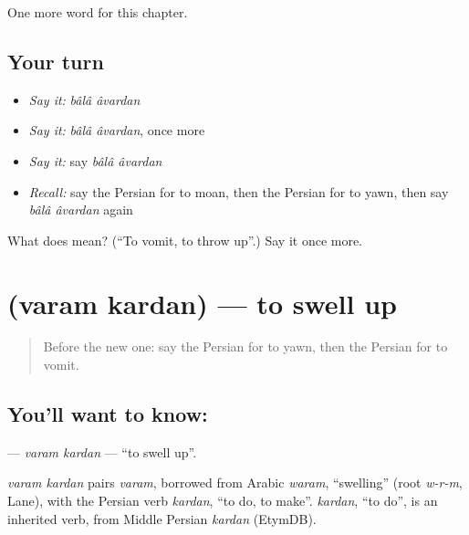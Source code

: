 \begin{grammarlens}[title={What you've built}]
One more word for this chapter.
\end{grammarlens}

\subsection*{Your turn}
\begin{itemize}
\raggedright
  \item \emph{Say it:} \emph{bâlâ âvardan}
  \item \emph{Say it:} \emph{bâlâ âvardan}, once more
  \item \emph{Say it:} say \emph{bâlâ âvardan}
  \item \emph{Recall:} say the Persian for to moan, then the Persian for to yawn, then say \emph{bâlâ âvardan} again
\end{itemize}

\begin{tcolorbox}[breakable,colback=teal!4,colframe=teal!35!black,title={Before you move on}]
What does   mean? (\textquotedblleft{}To vomit, to throw up\textquotedblright{}.) Say it once more.
\end{tcolorbox}
\section[\texorpdfstring{\fa{ورم} \fa{کردن} (varam kardan)}{ورم کردن (varam kardan)}]{  (varam kardan) — to swell up}

\label{lesson:FA-C225-varam-kardan}



\begin{quote}
Before the new one: say the Persian for to yawn, then the Persian for to vomit.
\end{quote}

\subsection*{You'll want to know:  }
\textbf{ } — \emph{varam kardan} — \textquotedblleft{}to swell up\textquotedblright{}.

\begin{cousinweb}
\emph{varam kardan} pairs \emph{varam}, borrowed from Arabic \emph{waram}, \textquotedblleft{}swelling\textquotedblright{} (root \emph{w-r-m}, Lane), with the Persian verb \emph{kardan}, \textquotedblleft{}to do, to make\textquotedblright{}. \emph{kardan}, \textquotedblleft{}to do\textquotedblright{}, is an inherited verb, from Middle Persian \emph{kardan} (EtymDB).
\end{cousinweb}


